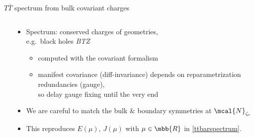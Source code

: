 \documentclass[aspectratio=169,10pt
	,noamsthm
]{beamer}
\newcommand{\TTbar}{\texorpdfstring{\ensuremath{T\bar{T}}}{TTbar}\xspace}
\begin{document}
\begin{frame}{\TTbar spectrum from bulk covariant charges}{%
	\textcite{Kraus:2021cwf,Apolo:2023vnm}
}
\begin{columns}
\begin{column}{.35\textwidth}
\figGlueon
\end{column}
\begin{column}{.65\textwidth}
\vspace{-.3\baselineskip}
\begin{itemize}
\item Spectrum: conserved charges of geometries,\\
	e.g.~black holes \textit{BTZ} \cite{Banados:1992wn}
	\begin{itemize}
	\item computed with the covariant formalism\\
		\textcite{Iyer:1994ys, Barnich:2001jy}
	\item manifest covariance (diff-invariance) depends on reparametrization redundancies (gauge),\\
		so delay gauge fixing until the very end
	\end{itemize}
	
\pause
\item We are careful to match the bulk \& boundary symmetries at $\mcal{N}_{\zeta_c}$

\item This reproduces $E(\mu)$, $J(\mu)$ with $\mu \in\mbb{R}$ in \eqref{ttbarspectrum}.
	
\end{itemize}
\end{column}
\end{columns}
\end{frame}
\end{document}
